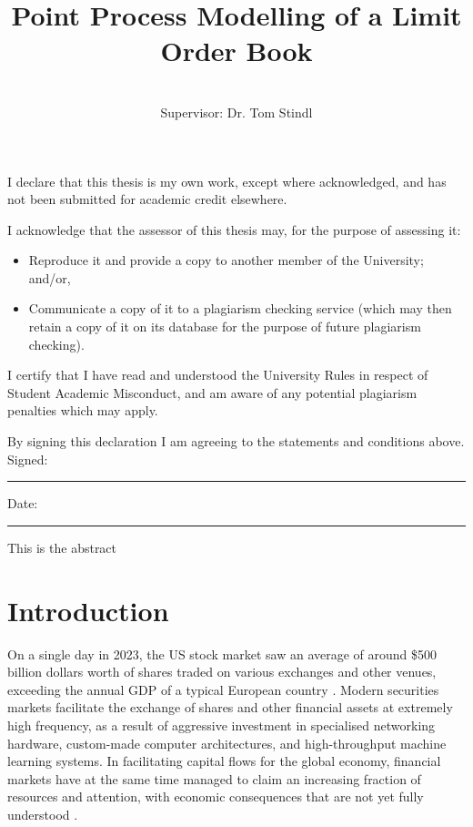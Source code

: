 \documentclass[honours,12pt]{unswthesis}
\title{Point Process Modelling of a Limit Order Book}
\author{\Authornameonly\\{\bigskip}Supervisor: Dr. Tom Stindl}
\newcommand\blankpage{%
    \null
    \thispagestyle{empty}%
    \addtocounter{page}{-1}%
    \newpage}
\numberwithin{equation}{section}
\begin{document}
\beforepreface

\afterpage{\blankpage}



\vskip 10pc \noindent I declare that this thesis is my
own work, except where acknowledged, and has not been submitted for
academic credit elsewhere. 

\vskip 2pc  \noindent I acknowledge that the assessor of this
thesis may, for the purpose of assessing it:
\begin{itemize}
\item Reproduce it and provide a copy to another member of the University; and/or,
\item Communicate a copy of it to a plagiarism checking service (which may then retain a copy of it on its database for the purpose of future plagiarism checking).
\end{itemize}

\vskip 2pc \noindent I certify that I have read and understood the University Rules in
respect of Student Academic Misconduct, and am aware of any potential plagiarism penalties which may 
apply.\vspace{24pt}

\vskip 2pc \noindent By signing 
this declaration I am
agreeing to the statements and conditions above.
\vskip 2pc \noindent
Signed: \rule{7cm}{0.25pt} \hfill Date: \rule{4cm}{0.25pt} \newline
\vskip 1pc

\afterpage{\blankpage}




\afterpage{\blankpage}



This is the abstract
\afterpage{\blankpage}


\afterpreface

\afterpage{\blankpage}

\chapter{Introduction}\label{s-intro}

On a single day in 2023, the US stock market saw an average of around \$500 billion dollars worth of shares traded on various exchanges and other venues, exceeding the annual GDP of a typical European country \cite{FINRA2024}. Modern securities markets facilitate the exchange of shares and other financial assets at extremely high frequency, as a result of aggressive investment in specialised networking hardware, custom-made computer architectures, and high-throughput machine learning systems. In facilitating capital flows for the global economy, financial markets have at the same time managed to claim an increasing fraction of resources and attention, with economic consequences that are not yet fully understood \cite{Palley2007}.
\end{document}
